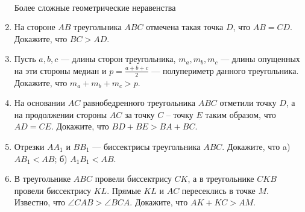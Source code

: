 \begin{enumerate}
$\textit{Более сложные геометрические неравенства}$

\item На стороне $AB$ треугольника $ABC$ отмечена такая точка $D$, что
$AB = CD$. Докажите, что $BC > AD$.

\item Пусть $a, b, c$ — длины сторон треугольника, $m_{a},m_{b},m_{c}$ --- длины опущенных на эти стороны медиан и $p=\frac{a+b+c}{2}$
--- полупериметр данного треугольника. Докажите, что $m_{a}+m_{b}+m_{c}>p$.

\item На основании $AC$ равнобедренного треугольника $ABC$ отметили точку $D$, а на продолжении стороны $AC$ за точку $C$ -- точку $E$ таким образом, что $AD=CE$. Докажите, что $BD+BE>BA+BC$.

\item Отрезки $AA_{1}$ и $BB_{1}$ — биссектрисы треугольника $ABC$. Докажите, что a) $AB_{1} < AB$; б) $A_{1}B_{1} < AB$. 

\item В треугольнике $ABC$ провели биссектрису $CK$, а в треугольнике $CKB$ провели биссектрису $KL$. Прямые $KL$ и $AC$ пересеклись в точке $M$. Известно, что $\angle CAB > \angle BCA$. Докажите, что $AK+KC>AM$.

\end{enumerate}